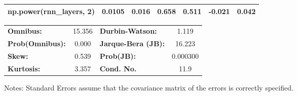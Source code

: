 \begin{center}
\begin{tabular}{lcccccc}
\textbf{np.power(rnn\_layers, 2)}         &       0.0105  &        0.016     &     0.658  &         0.511        &       -0.021    &        0.042     \\
\bottomrule
\end{tabular}
\begin{tabular}{lclc}
\textbf{Omnibus:}       & 15.356 & \textbf{  Durbin-Watson:     } &    1.119  \\
\textbf{Prob(Omnibus):} &  0.000 & \textbf{  Jarque-Bera (JB):  } &   16.223  \\
\textbf{Skew:}          &  0.539 & \textbf{  Prob(JB):          } & 0.000300  \\
\textbf{Kurtosis:}      &  3.357 & \textbf{  Cond. No.          } &     11.9  \\
\bottomrule
\end{tabular}
\end{center}

Notes: \newline
 [1] Standard Errors assume that the covariance matrix of the errors is correctly specified.